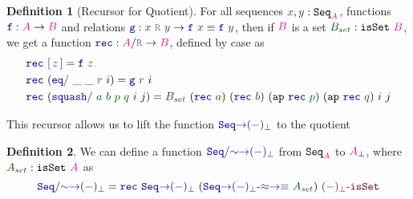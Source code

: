 \documentclass[twoside,11pt,openright]{report}
\theoremstyle{plain} %
\theoremstyle{definition}
\newtheorem{defn}{Definition}[section]
\theoremstyle{remark}
\newcommand*{\term}[1]{\textcolor{green!30!black}{#1}} %
\newcommand*{\pathterm}[1]{\textcolor{green!40!black}{#1}}
\newcommand*{\type}[1]{\textcolor{magenta!90!black}{#1}}
\newcommand*{\relation}[1]{\textcolor{gray}{\ensuremath{\mathtt{#1}}}}
\newcommand*{\function}[1]{\textcolor{blue!60!black}{\ensuremath{\mathtt{#1}}}}
\newcommand*{\constructor}[1]{\textcolor{purple!60!black}{\ensuremath{\mathtt{#1}}}}
\newcommand*{\typeformer}[1]{\ensuremath{\mathtt{#1}}}
\begin{document}
\begin{defn}[Recursor for Quotient]
  For all sequences \(\term{x}, \term{y} : \typeformer{Seq}_{\type{A}}\), functions \(\function{f} : \type{A} \rightarrow \type{B}\) and relations \(\function{g} : \term{x}~\relation{R}~\term{y} \rightarrow \function{f}~\term{x} \equiv \function{f}~\term{y}\), then if \(\type{B}\) is a set \(\term{B_{set}} : \typeformer{isSet}~\type{B}\), we get a function \(\function{rec} : \type{A} / \relation{R} \rightarrow \type{B}\), defined by case as
  \begin{equation}
    \label{eq:quotient-recursor}
    \begin{aligned}
      &\function{rec}~\function{[}\,\term{z}\,\function{]} = \function{f}~\term{z} \\
      &\function{rec}~(\function{eq/}~\_~\_~\term{r}~i) = \function{g}~\term{r}~i \\
      &\function{rec}~(\function{squash/}~\term{a}~\term{b}~\pathterm{p}~\pathterm{q}~i~j) = \term{B_{set}}~(\function{rec}~\term{a})~(\function{rec}~\term{b})~(\mathtt{ap}~\function{rec}~\pathterm{p})~(\mathtt{ap}~\function{rec}~\pathterm{q})~i~j
    \end{aligned}
  \end{equation}
\end{defn}
This recursor allows us to lift the function \(\function{Seq{\rightarrow}(-)_\bot}\) to the quotient
\begin{defn}
  \label{eq:QuotientedSeqToPartialityMonad}
  We can define a function \(\function{Seq/{\sim}{\rightarrow}(-)_\bot}\) from \(\typeformer{Seq}_{\type{A}}\) to \(\type{A}_{\bot}\), where \(\term{A_{set}} : \typeformer{isSet}~\type{A}\) as
  \begin{equation}
    \function{Seq/{\sim}{\rightarrow}(-)_\bot} = \function{rec}~\function{Seq{\rightarrow}(-)_\bot}~(\function{Seq{\rightarrow}(-)_\bot\text{-}{\approx}{\rightarrow}{\equiv}}~\term{A_{set}})~\constructor{(-)_\bot\text{-}isSet}
  \end{equation} 
\end{defn}
\end{document}
